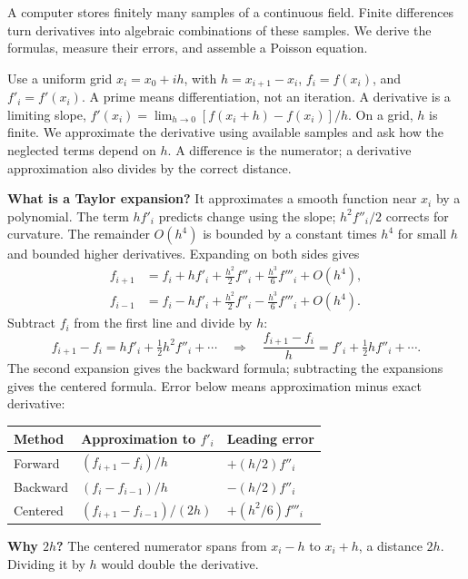 \label{sec:fd-slope}
A computer stores finitely many samples of a continuous field. Finite differences turn derivatives into algebraic combinations of these samples. We derive the formulas, measure their errors, and assemble a Poisson equation.

Use a uniform grid $x_i=x_0+ih$, with $h=x_{i+1}-x_i$, $f_i=f(x_i)$, and $f'_i=f'(x_i)$. A prime means differentiation, not an iteration. A derivative is a limiting slope, $f'(x_i)=\lim_{h\to0}[f(x_i+h)-f(x_i)]/h$. On a grid, $h$ is finite. We approximate the derivative using available samples and ask how the neglected terms depend on $h$. A difference is the numerator; a derivative approximation also divides by the correct distance.

\begin{center}
\end{center}
\textbf{What is a Taylor expansion?} It approximates a smooth function near $x_i$ by a polynomial. The term $hf'_i$ predicts change using the slope; $h^2f''_i/2$ corrects for curvature. The remainder $O(h^4)$ is bounded by a constant times $h^4$ for small $h$ and bounded higher derivatives. Expanding on both sides gives
\begin{align*}
f_{i+1}&=f_i+h f'_i+\frac{h^2}{2}f''_i+\frac{h^3}{6}f'''_i+O(h^4),\\
f_{i-1}&=f_i-h f'_i+\frac{h^2}{2}f''_i-\frac{h^3}{6}f'''_i+O(h^4).
\end{align*}
Subtract $f_i$ from the first line and divide by $h$:
\[
f_{i+1}-f_i=hf'_i+\tfrac12h^2f''_i+\cdots
\quad\Rightarrow\quad
\frac{f_{i+1}-f_i}{h}=f'_i+\tfrac12hf''_i+\cdots.
\]
The second expansion gives the backward formula; subtracting the expansions gives the centered formula. Error below means approximation minus exact derivative:
\begin{center}\begin{tabular}{lll}\toprule
Method & Approximation to $f'_i$ & Leading error\\\midrule
Forward & $(f_{i+1}-f_i)/h$ & $+(h/2)f''_i$\\[5pt]
Backward & $(f_i-f_{i-1})/h$ & $-(h/2)f''_i$\\[5pt]
Centered & $(f_{i+1}-f_{i-1})/(2h)$ & $+(h^2/6)f'''_i$\\\bottomrule
\end{tabular}\end{center}
\textbf{Why $2h$?} The centered numerator spans from $x_i-h$ to $x_i+h$, a distance $2h$. Dividing it by $h$ would double the derivative.


